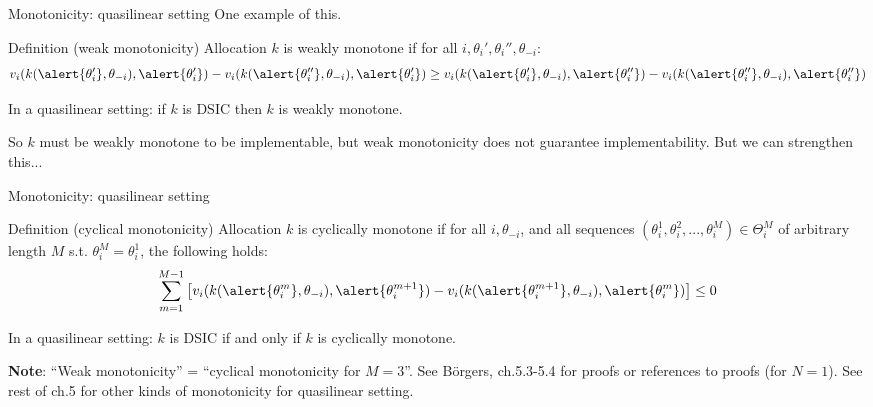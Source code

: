 \documentclass[english,10pt
,aspectratio=169
]{beamer}
\begin{document}
\begin{frame}{Monotonicity: quasilinear setting}
	One example of this.
	\begin{exampleblock}{Definition (weak monotonicity)}
		Allocation $k$ is \alert{weakly monotone} if for all $i,\theta_i',\theta_i'',\theta_{-i}$:
		\begin{equation*}
			v_{i}(k(\alert{\theta_{i}'}, \theta_{-i}), \alert{\theta_{i}'}) - 
			v_{i}(k(\alert{\theta_{i}''}, \theta_{-i}), \alert{\theta_{i}'}) 
			\geq 
			v_{i}(k(\alert{\theta_{i}'}, \theta_{-i}), \alert{\theta_{i}''}) - 
			v_{i}(k(\alert{\theta_{i}''}, \theta_{-i}), \alert{\theta_{i}''}) 
		\end{equation*}
	\end{exampleblock}
	\begin{theorem}
		In a quasilinear setting: if $k$ is DSIC then $k$ is weakly monotone.
	\end{theorem}
	So $k$ must be weakly monotone to be implementable, but weak monotonicity does not guarantee implementability. But we can strengthen this...
\end{frame}


\begin{frame}{Monotonicity: quasilinear setting}
	\begin{exampleblock}{Definition (cyclical monotonicity)}
		Allocation $k$ is \alert{cyclically monotone} if for all $i,\theta_{-i}$, and all sequences $(\theta_i^1,\theta_i^2,...,\theta_i^M)\in \Theta_i^M$ of arbitrary length $M$ s.t. $\theta_i^M=\theta_i^1$, the following holds:
		\begin{equation*}
			\sum_{m=1}^{M-1}
			\left[
			v_{i}(k(\alert{\theta_{i}^m}, \theta_{-i}), \alert{\theta_{i}^{m+1}}) - 
			v_{i}(k(\alert{\theta_{i}^{m+1}}, \theta_{-i}), \alert{\theta_{i}^m}) 
			\right] 
			\leq 0
		\end{equation*}
	\end{exampleblock}
	\begin{theorem}[Rochet, 1987]
		In a quasilinear setting: $k$ is DSIC if and only if $k$ is cyclically monotone.
	\end{theorem}
	\textbf{Note}: ``Weak monotonicity'' = ``cyclical monotonicity for $M=3$''.
	See B{\"o}rgers, ch.5.3-5.4 for proofs or references to proofs (for $N=1$). See rest of ch.5 for other kinds of monotonicity for quasilinear setting.
\end{frame}
\end{document}
